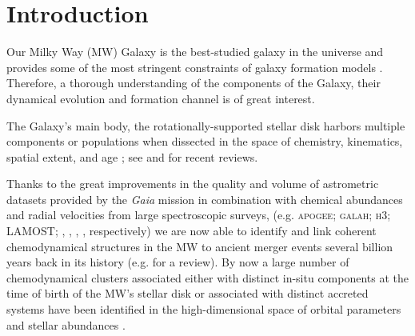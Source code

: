 \documentclass[useAMS,usenatbib]{mnras}
\begin{document}


\section{Introduction} \label{sec:introduction}

Our Milky Way (MW) Galaxy is the best-studied galaxy in the
universe and provides some of the most stringent constraints of galaxy formation
models \citep[e.g.,][]{Guedes2011, Wetzel2016, Grand2017, Hopkins2018, Buck2020a}. Therefore, a thorough understanding of the components of the Galaxy, their dynamical evolution and formation channel is of great interest.

The Galaxy's main body, the rotationally-supported stellar disk harbors multiple components or populations when dissected in the space of chemistry, kinematics, spatial extent, and age \citep[e.g.,][]{Gilmore1983, Norris1985, Chiba2000, Nissen2010, Bovy2012, Haywood2013}; see \citet{Rix2013} and \citet{Bland-Hawthorn2016} for recent reviews.

Thanks to the great improvements in the quality and volume of astrometric datasets provided by the {\it Gaia} mission \citep{Gaia} in combination with chemical abundances and radial velocities from large spectroscopic surveys, (e.g. \textsc{apogee}; \textsc{galah}; \textsc{h3}; \textsc{LAMOST}; \citealt{Majewski2017}, \citealt{Martell2017,Buder2021}, \citealt{Conroy2019}, \citealt{Zhao2012}, respectively) we are now able to identify and link coherent chemodynamical structures in the MW to ancient merger events several billion years back in its history (e.g. \citealt{Helmi2020} for a review). By now a large number of chemodynamical clusters associated either with distinct in-situ components at the time of birth of the MW's stellar disk \citep[e.g.][]{Belokurov2022,Conroy2022,Rix2022} or associated with distinct accreted systems have been identified in the high-dimensional space of orbital parameters and stellar abundances \citep[e.g.,][]{Myeong2019, Naidu2020, Horta2021, Buder2022}.
\end{document}

